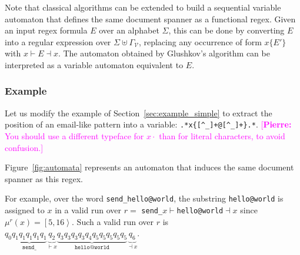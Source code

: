 \documentclass[12px]{article}
\theoremstyle{definition}
\newcommand{\Span}[1]{\left[ #1 \right\rangle}
\newcommand{\pierre}[1]{\textcolor{magenta}{[\textbf{Pierre:} #1]}}
\begin{document}
        Note that classical algorithms can be extended to build a sequential
        variable automaton that defines the same document spanner as a
        functional regex. Given an input regex formula $E$ over an alphabet
        $\Sigma$, this can be done by converting $E$ into a regular expression
        over $\Sigma \uplus \Gamma_\mathcal{V}$, replacing any occurrence of
        form $x\{E'\}$ with $x{\vdash} E {\dashv}x$. The automaton obtained by
        Glushkov's algorithm can be interpreted as a variable automaton
        equivalent to $E$.

      \subsubsection{Example}

        Let us modify the example of Section~\ref{sec:example_simple} to extract
        the position of an email-like pattern into a variable:
        \texttt{.*x\{[\textasciicircum\_]+@[\textasciicircum\_]+\}.*}.
        \pierre{You should use a different typeface for $x{\cdot}$ than
        for literal characters, to avoid confusion.}

        Figure~\ref{fig:automata} represents an automaton that induces the same
        document spanner as this regex.

        For example, over the word \texttt{send\_hello@world}, the substring
        \texttt{hello@world} is assigned to $x$ in a valid run over $r =$
        \texttt{send\_$x{\vdash}$hello@world${\dashv}x$} since $\mu^r(x) =
        \Span{5, 16}$. Such a valid run over $r$ is $q_0 \underbrace{q_1 q_1 q_1
        q_1 q_1}_\texttt{send\_} \underbrace{q_2}_{{\vdash}x} \underbrace{q_3 q_3
        q_3 q_3 q_4 q_5 q_5 q_5 q_5 q_5}_\texttt{hello@world}
        \underbrace{q_6}_{{\dashv}x}$.
\end{document}
